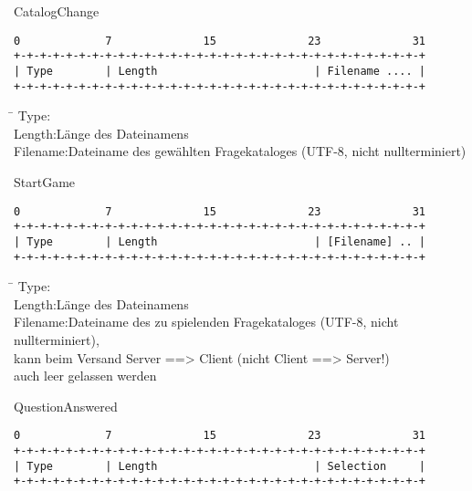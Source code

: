 \documentclass[a4paper,10pt]{article}
\begin{document}
$~~$\\CatalogChange

\begin{Verbatim}[fontfamily=courier]
0             7              15              23              31
+-+-+-+-+-+-+-+-+-+-+-+-+-+-+-+-+-+-+-+-+-+-+-+-+-+-+-+-+-+-+-+
| Type        | Length                        | Filename .... |
+-+-+-+-+-+-+-+-+-+-+-+-+-+-+-+-+-+-+-+-+-+-+-+-+-+-+-+-+-+-+-+
\end{Verbatim}

\begin{tabbing}
\hspace{2 cm}\=\kill
Type:\\
Length:\>Länge des Dateinamens\\
Filename:\>Dateiname des gewählten Fragekataloges (UTF-8, nicht nullterminiert)\\
\end{tabbing}


$~~$\\StartGame

\begin{Verbatim}[fontfamily=courier]
0             7              15              23              31
+-+-+-+-+-+-+-+-+-+-+-+-+-+-+-+-+-+-+-+-+-+-+-+-+-+-+-+-+-+-+-+
| Type        | Length                        | [Filename] .. |
+-+-+-+-+-+-+-+-+-+-+-+-+-+-+-+-+-+-+-+-+-+-+-+-+-+-+-+-+-+-+-+
\end{Verbatim}

\begin{tabbing}
\hspace{2 cm}\=\kill
Type:\\
Length:\>Länge des Dateinamens\\
Filename:\>Dateiname des zu spielenden Fragekataloges (UTF-8, nicht nullterminiert), \\
\>kann beim Versand Server ==> Client (nicht Client ==> Server!) \\
\>auch leer gelassen werden\\
\end{tabbing}

$~~$\\QuestionAnswered

\begin{Verbatim}[fontfamily=courier]
0             7              15              23              31
+-+-+-+-+-+-+-+-+-+-+-+-+-+-+-+-+-+-+-+-+-+-+-+-+-+-+-+-+-+-+-+
| Type        | Length                        | Selection     |
+-+-+-+-+-+-+-+-+-+-+-+-+-+-+-+-+-+-+-+-+-+-+-+-+-+-+-+-+-+-+-+
\end{Verbatim}
\end{document}
